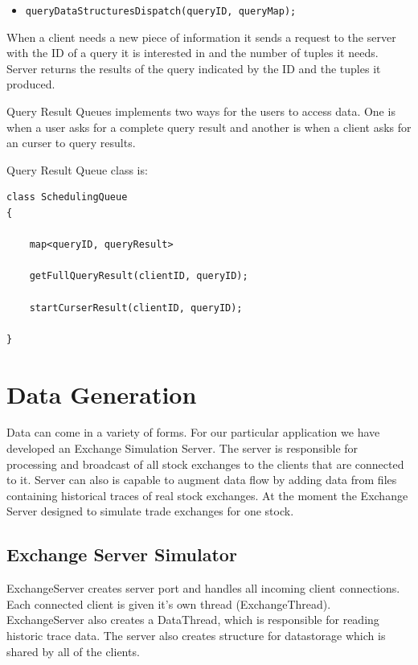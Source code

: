 \documentclass[11pt]{article}
\begin{document}
\begin{itemize}
	\item {\tt queryDataStructuresDispatch(queryID, queryMap);}
\end{itemize}

\noindent When a client needs a new piece of information it sends a request to the server with the ID of a query it is interested in and the number of tuples it needs. Server returns the results of the query indicated by the ID and the tuples it produced. 

Query Result Queues implements two ways for the users to access data. One is when a user asks for a complete query result and another is when a client asks for an curser to query results.

Query Result Queue class is:

\begin{verbatim}
class SchedulingQueue
{
    
	map<queryID, queryResult>
	
	getFullQueryResult(clientID, queryID);
	
	startCurserResult(clientID, queryID);
	
}
\end{verbatim}




\section{Data Generation}

Data can come in a variety of forms. For our particular application we have developed an Exchange Simulation Server. The server is responsible for processing and broadcast of all stock exchanges to the clients that are connected to it. Server can also is capable to augment data flow by adding data from files containing historical traces of real stock exchanges. At the moment the Exchange Server designed to simulate trade exchanges for one stock.   

\subsection{Exchange Server Simulator}
ExchangeServer creates server port and handles all incoming client connections. Each connected client is given it's own thread (ExchangeThread). ExchangeServer also creates a DataThread, which is responsible for reading historic trace data. The server also creates structure for datastorage which is shared by all of the clients.
\end{document}
